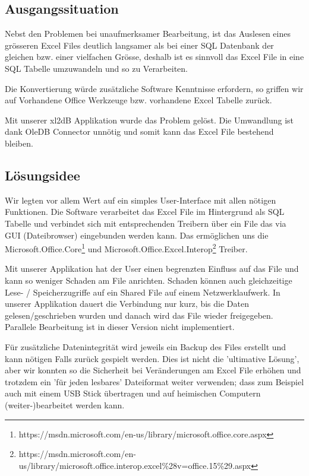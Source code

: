 \documentclass{article}
\begin{document}
\subsection{Ausgangssituation}
Nebst den Problemen bei unaufmerksamer Bearbeitung, ist das Auslesen eines grösseren Excel Files deutlich langsamer als bei einer SQL Datenbank der gleichen bzw. einer vielfachen Grösse, deshalb ist es sinnvoll das Excel File in eine SQL Tabelle umzuwandeln und so zu Verarbeiten.

Die Konvertierung würde zusätzliche Software Kenntnisse erfordern, so griffen wir auf Vorhandene Office Werkzeuge bzw. vorhandene Excel Tabelle zurück.

Mit unserer xl2dB Applikation wurde das Problem gelöst. Die Umwandlung ist dank OleDB Connector unnötig und somit kann das Excel File bestehend bleiben.

\subsection{Lösungsidee}
Wir legten vor allem Wert auf ein simples User-Interface mit allen nötigen Funktionen. Die Software verarbeitet das Excel File im Hintergrund als SQL Tabelle und verbindet sich mit entsprechenden Treibern über ein File das via GUI (Dateibrowser) eingebunden werden kann. Das ermöglichen uns die Microsoft.Office.Core\footnote{https://msdn.microsoft.com/en-us/library/microsoft.office.core.aspx}  und Microsoft.Office.Excel.Interop\footnote{https://msdn.microsoft.com/en-us/library/microsoft.office.interop.excel\%28v=office.15\%29.aspx} Treiber.

Mit unserer Applikation hat der User einen begrenzten Einfluss auf das File und kann so weniger Schaden am File anrichten. Schaden können auch gleichzeitige Lese- / Speicherzugriffe auf ein Shared File auf einem Netzwerklaufwerk. In unserer Applikation dauert die Verbindung nur kurz, bis die Daten gelesen/geschrieben wurden und danach wird das File wieder freigegeben. Parallele Bearbeitung ist in dieser Version nicht implementiert.

Für zusätzliche Datenintegrität wird jeweils ein Backup des Files erstellt und kann nötigen Falls zurück gespielt werden. Dies ist nicht die 'ultimative Lösung', aber wir konnten so die Sicherheit bei Veränderungen am Excel File erhöhen und trotzdem ein 'für jeden lesbares' Dateiformat weiter verwenden; dass zum Beispiel auch mit einem USB Stick übertragen und auf heimischen Computern (weiter-)bearbeitet werden kann.
\end{document}
